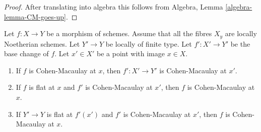\begin{proof}
After translating into algebra this follows from
Algebra, Lemma \ref{algebra-lemma-CM-goes-up}.
\end{proof}

\begin{lemma}
\label{lemma-base-change-CM}
Let $f : X \to Y$ be a morphism of schemes.
Assume that all the fibres $X_y$ are locally Noetherian schemes.
Let $Y' \to Y$ be locally of finite type. Let $f' : X' \to Y'$
be the base change of $f$.
Let $x' \in X'$ be a point with image $x \in X$.
\begin{enumerate}
\item If $f$ is Cohen-Macaulay at $x$, then
$f' : X' \to Y'$ is Cohen-Macaulay at $x'$.
\item If $f$ is flat at $x$ and $f'$ is Cohen-Macaulay at $x'$, then $f$
is Cohen-Macaulay at $x$.
\item If $Y' \to Y$ is flat at $f'(x')$ and $f'$ is Cohen-Macaulay at
$x'$, then $f$ is Cohen-Macaulay at $x$.
\end{enumerate}
\end{lemma}

